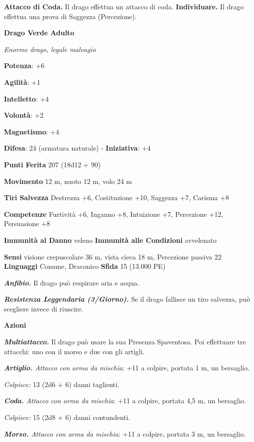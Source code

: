 \begin{multicols}{2}
\textbf{Attacco di Coda.} Il drago effettua un attacco di coda.
\textbf{Individuare.} Il drago effettua una prova di Saggezza
(Percezione).

\textbf{Drago Verde Adulto}

\emph{Enorme drago, legale malvagio}

\textbf{Potenza}: +6

\textbf{Agilità}: +1

\textbf{Intelletto}: +4

\textbf{Volontà}: +2

\textbf{Magnetismo}: +4

\textbf{Difesa}: 24 (armatura naturale) - \textbf{Iniziativa}: +4

\textbf{Punti Ferita} 207 (18d12 + 90)

\textbf{Movimento} 12 m, nuoto 12 m, volo 24 m

\textbf{Tiri Salvezza} Destrezza +6, Costituzione +10, Saggezza +7,
Carisma +8

\textbf{Competenze} Furtività +6, Inganno +8, Intuizione +7, Percezione
+12, Persuasione +8

\textbf{Immunità al Danno} veleno \textbf{Immunità alle Condizioni}
avvelenato

\textbf{Sensi} visione crepuscolare 36 m, vista cieca 18 m, Percezione passiva
22 \textbf{Linguaggi} Comune, Draconico \textbf{Sfida} 15 (13.000 PE)\smallskip

\emph{\textbf{Anfibio.}} Il drago può respirare aria e acqua.

\emph{\textbf{Resistenza Leggendaria (3/Giorno).}} Se il drago fallisce
un tiro salvezza, può scegliere invece di riuscire.

\smallskip\textbf{Azioni}

\emph{\textbf{Multiattacco.}} Il drago può usare la sua Presenza
Spaventosa. Poi effettuare tre attacchi: uno con il morso e due con gli
artigli.

\emph{\textbf{Artiglio.} Attacco con arma da mischia}: +11 a colpire,
portata 1 m, un bersaglio.

\emph{Colpisce:} 13 (2d6 + 6) danni taglienti.

\emph{\textbf{Coda.} Attacco con arma da mischia}: +11 a colpire,
portata 4,5 m, un bersaglio.

\emph{Colpisce:} 15 (2d8 + 6) danni contundenti.

\emph{\textbf{Morso.} Attacco con arma da mischia}: +11 a colpire,
portata 3 m, un bersaglio.


\end{multicols}
